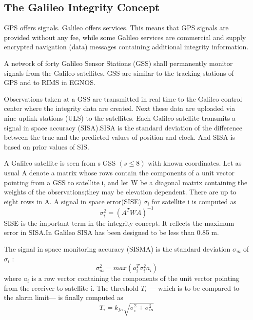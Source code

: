 		
	\subsection{The Galileo Integrity Concept}
		GPS offers signals. Galileo offers services. This means that GPS signals are provided without any fee, while some Galileo services are commercial and supply encrypted navigation (data) messages containing additional integrity information.
		
		A network of forty Galileo Sensor Stations (GSS) shall permanently monitor signals from the Galileo satellites. GSS are similar to the tracking stations of GPS and to RIMS in EGNOS. 
		
		Observations taken at a GSS are transmitted in real time to the Galileo control center where the integrity data are created. Next these data are uploaded via nine uplink stations (ULS) to the satellites. Each Galileo satellite transmits a signal in space accuracy (SISA).SISA is the standard deviation of the difference between the true and the predicted values of position and clock. And SISA is based on prior values of SIS.
		
		A Galileo satellite is seen from s GSS $(s\leq8)$ with known coordinates. Let as usual A denote a matrix whose rows contain the components of a unit vector pointing from a GSS to satellite i, and let W be a diagonal matrix containing the weights of the observations;they may be elevation dependent. There are up to eight rows in A. A signal in space error(SISE) $\sigma_i$ for satellite i is computed as
		\begin{equation*}
			\sigma^2_i=(A^TWA)^{-1}
		\end{equation*}
		SISE is the important term in the integrity concept. It reflects the maximum error in SISA.In Galileo SISA has been designed to be less than 0.85 m.
		
		The signal in space monitoring accuracy (SISMA) is the standard deviation $\sigma_m$ of $\sigma_i$ :
		\begin{equation*}
			\sigma^2_m=max(a^T_i\sigma^2_ia_i)
		\end{equation*}
		where $a_i$ is a row vector containing the components of the unit vector pointing from the	receiver to satellite i. The threshold $T_i$ — which is to be compared to the alarm limit— is finally computed as
		\begin{equation}\label{eq:9.78}
			T_i=k_{fa}\sqrt{\sigma^2_i+\sigma^2_m}
		\end{equation}
		
